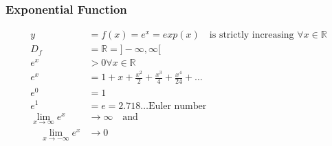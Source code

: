 \subsubsection*{Exponential Function}
\begin{align*}
	y&=f(x)=e^x=exp(x) \quad \text{is strictly increasing } \forall x \in \mathbb R \\
	D_f&=\mathbb R= ]-\infty,\infty[\\
	e^x&> 0 \forall x \in \mathbb R\\
	e^x&= 1+x+\frac{x^2}{2}+\frac{x^3}{4}+\frac{x^4}{24}+\dots\\
	e^0&= 1\\
	e^1&= e= 2.718\dots \text{Euler number}\\
	\lim\limits_{x\rightarrow\infty}e^x&\rightarrow\infty \quad \text{and}\\
	\quad \lim\limits_{x\rightarrow - \infty}e^x& \rightarrow 0
\end{align*}

